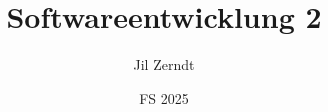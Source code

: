 \documentclass[a4paper, fontsize = 8pt, landscape]{scrartcl}
\title{Softwareentwicklung 2}
\author{Jil Zerndt}
\date{FS 2025}
\begin{document}
\begin{multicols}{2}
	\thispagestyle{TitlePageStyle}
	\maketitle
	\sffamily
	
	\raggedcolumns
	\pagebreak
	
	\raggedcolumns
	\pagebreak
	
	\raggedcolumns
	\pagebreak
	
	\raggedcolumns
	\pagebreak
	
	\raggedcolumns
	\pagebreak
	
	\raggedcolumns
	\pagebreak
	
	\raggedcolumns
	\pagebreak
	
	\raggedcolumns
	\pagebreak
	
	\raggedcolumns
	\pagebreak
	
	\raggedcolumns
	\pagebreak
	
	\raggedcolumns
\end{multicols}
\end{document}
